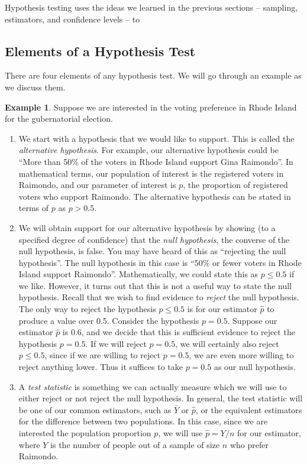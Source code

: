 \documentclass[12pt]{article}
\theoremstyle{definition}
\newtheorem*{example}{Example}
\theoremstyle{remark}
\begin{document}
Hypothesis testing uses the ideas we learned in the previous sections -- sampling, estimators, and confidence levels -- to 

\subsection{Elements of a Hypothesis Test}
There are four elements of any hypothesis test. We will go through an example as we discuss them. 

\begin{example}Suppose we are interested in the voting preference in Rhode Island for the gubernatorial election. 
\begin{enumerate}
\item We start with a hypothesis that we would like to support. This is called the \emph{alternative hypothesis}. For example, our alternative hypothesis could be ``More than 50\% of the voters in Rhode Island support Gina Raimondo''. In mathematical terms, our population of interest is the registered voters in Raimondo, and our parameter of interest is $p$, the proportion of registered voters who support Raimondo. The alternative hypothesis can be stated in terms of $p$ as $p > 0.5$. 
\item We will obtain support for our alternative hypothesis by showing (to a specified degree of confidence) that the \emph{null hypothesis}, the converse of the null hypothesis, is false. You may have heard of this as ``rejecting the null hypothesis''. The null hypothesis in this case is ``50\% or fewer voters in Rhode Island support Raimondo''. Mathematically, we could state this as $p \leq 0.5$ if we like. However, it turns out that this is not a useful way to state the null hypothesis. Recall that we wish to find evidence to \emph{reject} the null hypothesis. The only way to reject the hypothesis $p \leq 0.5$ is for our estimator $\hat{p}$ to produce a value over 0.5. Consider the hypothesis $p = 0.5$. Suppose our estimator $\hat{p}$ is 0.6, and we decide that this is sufficient evidence to reject the hypothesis $p = 0.5$. If we will reject $p = 0.5$, we will certainly also reject $p \leq 0.5$, since if we are willing to reject $p = 0.5$, we are even more willing to reject anything lower. Thus it suffices to take $p = 0.5$ as our null hypothesis.
\item A \emph{test statistic} is something we can actually measure which we will use to either reject or not reject the null hypothesis. In general, the test statistic will be one of our common estimators, such as $\bar{Y}$ or $\hat{p}$, or the equivalent estimators for the difference between two populations. In this case, since we are interested the population proportion $p$, we will use $\hat{p} = Y/n$ for our estimator, where $Y$ is the number of people out of a sample of size $n$ who prefer Raimondo.

\end{enumerate}
\end{example}
\end{document}
